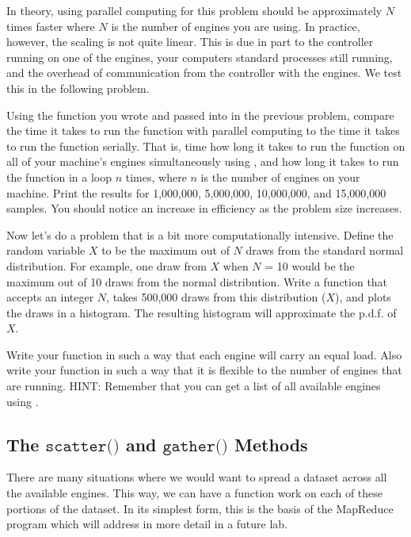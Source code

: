 In theory, using parallel computing for this problem should be approximately $N$ times faster where $N$ is the number of engines you are using.
In practice, however, the scaling is not quite linear.
This is due in part to the controller running on one of the engines, your computers standard processes still running, and the overhead of communication from the controller with the engines.
We test this in the following problem.

\begin{problem}
Using the function you wrote and passed into  in the previous problem, compare the time it takes to run the function with parallel computing to the time it takes to run the function serially.
That is, time how long it takes to run the function on all of your machine's engines simultaneously using , and how long it takes to run the function in a  loop $n$ times, where $n$ is the number of engines on your machine.
Print the results for 1,000,000, 5,000,000, 10,000,000, and 15,000,000 samples.
You should notice an increase in efficiency as the problem size increases.
\end{problem}

\begin{problem}
Now let's do a problem that is a bit more computationally intensive. 
Define the random variable $X$ to be the maximum out of $N$ draws from the standard normal distribution.
For example, one draw from $X$ when $N$ = 10 would be the maximum out of 10 draws from the normal distribution.
Write a function that accepts an integer $N$, takes 500,000 draws from this distribution ($X$), and plots the draws in a histogram.
The resulting histogram will approximate the p.d.f. of $X$.

Write your function in such a way that each engine will carry an equal load. Also write your function in such a way that it is flexible to the number of engines that are running. HINT: Remember that you can get a list of all available engines using .
\end{problem}

\subsection*{The $\texttt{scatter()}$ and $\texttt{gather()}$ Methods}
There are many situations where we would want to spread a dataset across all the available engines. 
This way, we can have a function work on each of these portions of the dataset. 
In its simplest form, this is the basis of the MapReduce program which will address in more detail in a future lab.

